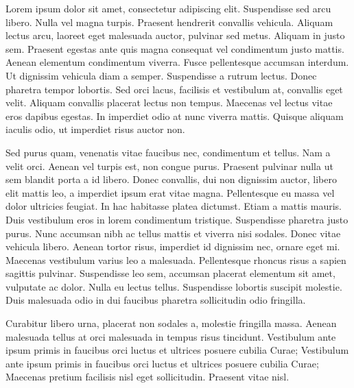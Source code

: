 Lorem ipsum dolor sit amet, consectetur adipiscing elit. Suspendisse sed arcu libero. Nulla vel magna turpis. Praesent hendrerit convallis vehicula. Aliquam lectus arcu, laoreet eget malesuada auctor, pulvinar sed metus. Aliquam in justo sem. Praesent egestas ante quis magna consequat vel condimentum justo mattis. Aenean elementum condimentum viverra. Fusce pellentesque accumsan interdum. Ut dignissim vehicula diam a semper. Suspendisse a rutrum lectus. Donec pharetra tempor lobortis. Sed orci lacus, facilisis et vestibulum at, convallis eget velit. Aliquam convallis placerat lectus non tempus. Maecenas vel lectus vitae eros dapibus egestas. In imperdiet odio at nunc viverra mattis. Quisque aliquam iaculis odio, ut imperdiet risus auctor non.

Sed purus quam, venenatis vitae faucibus nec, condimentum et tellus. Nam a velit orci. Aenean vel turpis est, non congue purus. Praesent pulvinar nulla ut sem blandit porta a id libero. Donec convallis, dui non dignissim auctor, libero elit mattis leo, a imperdiet ipsum erat vitae magna. Pellentesque eu massa vel dolor ultricies feugiat. In hac habitasse platea dictumst. Etiam a mattis mauris. Duis vestibulum eros in lorem condimentum tristique. Suspendisse pharetra justo purus. Nunc accumsan nibh ac tellus mattis et viverra nisi sodales. Donec vitae vehicula libero. Aenean tortor risus, imperdiet id dignissim nec, ornare eget mi. Maecenas vestibulum varius leo a malesuada. Pellentesque rhoncus risus a sapien sagittis pulvinar. Suspendisse leo sem, accumsan placerat elementum sit amet, vulputate ac dolor. Nulla eu lectus tellus. Suspendisse lobortis suscipit molestie. Duis malesuada odio in dui faucibus pharetra sollicitudin odio fringilla.

Curabitur libero urna, placerat non sodales a, molestie fringilla massa. Aenean malesuada tellus at orci malesuada in tempus risus tincidunt. Vestibulum ante ipsum primis in faucibus orci luctus et ultrices posuere cubilia Curae; Vestibulum ante ipsum primis in faucibus orci luctus et ultrices posuere cubilia Curae; Maecenas pretium facilisis nisl eget sollicitudin. Praesent vitae nisl. 
